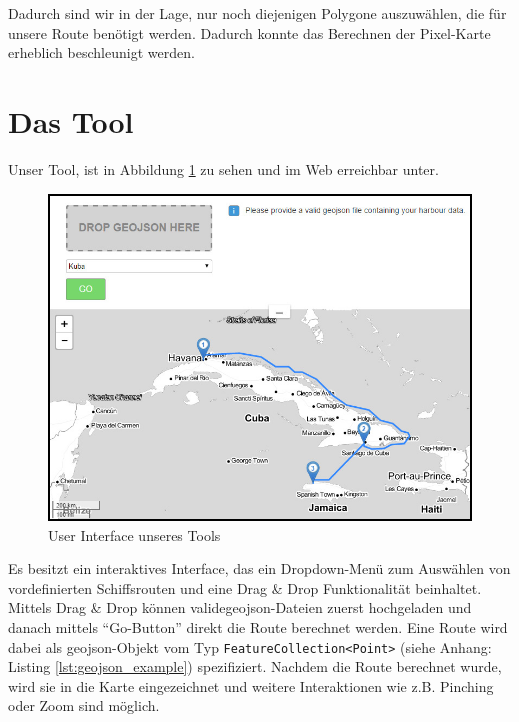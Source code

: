 \documentclass[letterpaper]{article}
\begin{document}
	Dadurch sind wir in der Lage, nur noch diejenigen Polygone auszuwählen, die für unsere Route benötigt werden. Dadurch konnte das Berechnen der Pixel-Karte erheblich beschleunigt werden.

\section{Das Tool}
	Unser Tool, ist in Abbildung \ref{fig:tool} zu sehen und im Web erreichbar unter\footnotemark.


	\begin{figure}[htbp]
		\centering
		\includegraphics[width=\linewidth]{tool}
		\caption{User Interface unseres Tools}
		\label{fig:tool}
	\end{figure}

	Es besitzt ein interaktives Interface, das ein Dropdown-Menü zum Auswählen von vordefinierten Schiffsrouten und eine Drag \& Drop Funktionalität beinhaltet. 
	Mittels Drag \& Drop können valide\footnotemark geojson-Dateien zuerst hochgeladen und danach mittels "`Go-Button"' direkt die Route berechnet werden. Eine Route wird dabei als geojson-Objekt vom Typ \texttt{FeatureCollection<Point>} (siehe Anhang: Listing \ref{lst:geojson_example}) spezifiziert.
	Nachdem die Route berechnet wurde, wird sie in die Karte eingezeichnet und weitere Interaktionen wie z.B. Pinching oder Zoom sind möglich.

\end{document}
